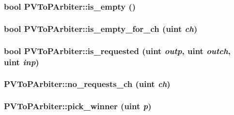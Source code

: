 \hypertarget{classPVToPArbiter_18a0ad4791e9ad5f0360be68d5068ba3}{
\subsubsection[{is\_\-empty}]{\setlength{\rightskip}{0pt plus 5cm}bool PVToPArbiter::is\_\-empty ()}}
\label{classPVToPArbiter_18a0ad4791e9ad5f0360be68d5068ba3}


\hypertarget{classPVToPArbiter_e7d0a9f761895e79ea20eabb03b30698}{
\subsubsection[{is\_\-empty\_\-for\_\-ch}]{\setlength{\rightskip}{0pt plus 5cm}bool PVToPArbiter::is\_\-empty\_\-for\_\-ch ({\bf uint} {\em ch})}}
\label{classPVToPArbiter_e7d0a9f761895e79ea20eabb03b30698}


\hypertarget{classPVToPArbiter_5a653ce30ac803621098e9b5f3c42d3c}{
\subsubsection[{is\_\-requested}]{\setlength{\rightskip}{0pt plus 5cm}bool PVToPArbiter::is\_\-requested ({\bf uint} {\em outp}, \/  {\bf uint} {\em outch}, \/  {\bf uint} {\em inp})}}
\label{classPVToPArbiter_5a653ce30ac803621098e9b5f3c42d3c}


\hypertarget{classPVToPArbiter_57136c1a881be827b1e5a844e09021f9}{
\subsubsection[{no\_\-requests\_\-ch}]{ PVToPArbiter::no\_\-requests\_\-ch ({\bf uint} {\em ch})}}
\label{classPVToPArbiter_57136c1a881be827b1e5a844e09021f9}


\hypertarget{classPVToPArbiter_a51339b2519b84caa8fd27e49f8a240c}{
\subsubsection[{pick\_\-winner}]{ PVToPArbiter::pick\_\-winner ({\bf uint} {\em p})}}
\label{classPVToPArbiter_a51339b2519b84caa8fd27e49f8a240c}


